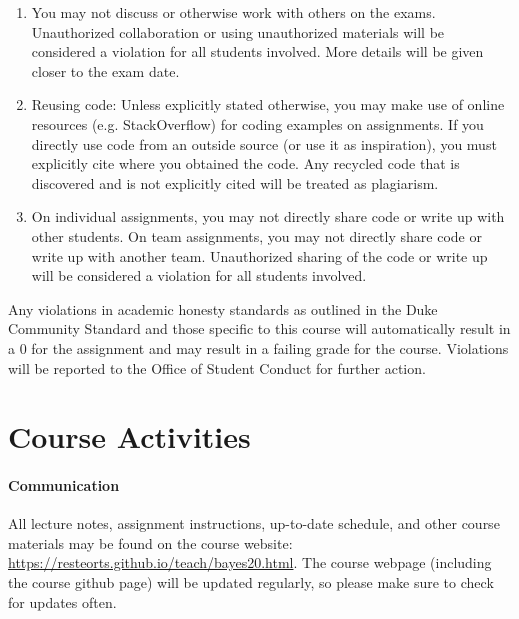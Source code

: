 \documentclass[11pt]{article}
\begin{document}
\begin{enumerate}
\item You may not discuss or otherwise work with others on the exams. Unauthorized collaboration or using unauthorized materials will be considered a violation for all students involved. More details will be given closer to the exam date.
\item Reusing code: Unless explicitly stated otherwise, you may make use of online resources (e.g. StackOverflow) for coding examples on assignments. If you directly use code from an outside source (or use it as inspiration), you must explicitly cite where you obtained the code. Any recycled code that is discovered and is not explicitly cited will be treated as plagiarism.
\item On individual assignments, you may not directly share code or write up with other students. On team assignments, you may not directly share code or write up with another team. Unauthorized sharing of the code or write up will be considered a violation for all students involved.
\end{enumerate}

Any violations in academic honesty standards as outlined in the Duke Community Standard and those specific to this course will automatically result in a 0 for the assignment and may result in a failing grade for the course. Violations will be reported to the Office of Student Conduct for further action.















\section{Course Activities}

\paragraph{Communication} 
All lecture notes, assignment instructions, up-to-date schedule, and other course materials may be found on the course website: \url{https://resteorts.github.io/teach/bayes20.html}. The course webpage (including the course github page) will be updated regularly, so please make sure to check for updates often. \\
\end{document}
